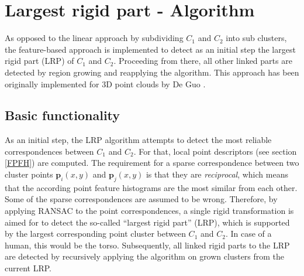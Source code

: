 \section{Largest rigid part - Algorithm}
\label{LRP}

As opposed to the linear approach by subdividing $C_1$ and $C_2$ into sub clusters, the feature-based approach is implemented to detect as an initial step the largest rigid part (LRP) of $C_1$ and $C_2$. Proceeding from there, all other linked parts are detected by region growing and reapplying the algorithm. This approach has been originally implemented for 3D point clouds by De Guo \cite{guo2016correspondence}. 

\subsection{Basic functionality}
\label{functionalityLRP}
As an initial step, the LRP algorithm  attempts to detect the most reliable correspondences between $C_1$ and $C_2$. For that, local point descriptors (see section \ref{FPFH}) are computed. The requirement for a sparse correspondence between two cluster points $\boldsymbol{p}_i(x,y)$ and $\boldsymbol{p}_j(x,y)$ is that they are \textit{reciprocal}, which means that the according point feature histograms are the most similar from each other. Some of the sparse correspondences are assumed to be wrong. Therefore, by applying RANSAC to the point correspondences, a single rigid transformation is aimed for to detect the so-called ``largest rigid part'' (LRP), which is supported by the largest corresponding point cluster between $C_1$ and $C_2$. In case of a human, this would be the torso. Subsequently, all linked rigid parts to the LRP are detected by recursively applying the algorithm on grown clusters from the current LRP.

